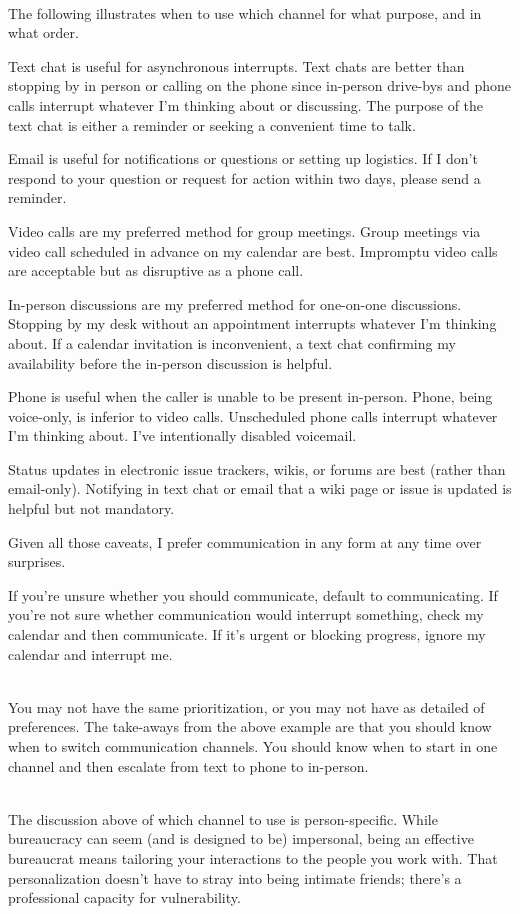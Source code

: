 \ \\

The following illustrates when to use which channel for what purpose, and in what order. 

Text chat is useful for asynchronous interrupts. Text chats are better than stopping by in person or calling on the phone since in-person drive-bys and phone calls interrupt whatever I'm thinking about or discussing. The purpose of the text chat is either a reminder or seeking a convenient time to talk. 

Email is useful for notifications or questions or setting up logistics. If I don't respond to your question or request for action within two days, please send a reminder. 

Video calls are my preferred method for group meetings. Group meetings via video call scheduled in advance on my calendar are best. Impromptu video calls are acceptable but as disruptive as a phone call. 

In-person discussions are my preferred method for one-on-one discussions. Stopping by my desk  without an appointment interrupts whatever I'm thinking about. If a calendar invitation is inconvenient, a text chat confirming my availability before the in-person discussion is helpful. 

Phone is useful when the caller is unable to be present in-person. Phone, being voice-only, is inferior to video calls. Unscheduled phone calls interrupt whatever I'm thinking about. I've intentionally disabled voicemail. 

Status updates in electronic issue trackers, wikis, or forums are best (rather than email-only). Notifying in text chat or email that a wiki page or issue is updated is helpful but not mandatory. 

Given all those caveats, I prefer communication in any form at any time over surprises. 

If you're unsure whether you should communicate, default to communicating. If you're not sure whether communication would interrupt something, check my calendar and then communicate. If it's urgent or blocking progress, ignore my calendar and interrupt me. 

\ \\

You may not have the same prioritization, or you may not have as detailed of preferences. The take-aways from the above example are that you should know when to switch communication channels.
You should know when to start in one channel and then escalate from text to phone to in-person.

\ \\


The discussion above of which channel to use is person-specific. While bureaucracy can seem (and is designed to be) impersonal, being an effective bureaucrat means tailoring your interactions to the people you work with. That personalization doesn't have to stray into being intimate friends; there's a professional capacity for vulnerability. 